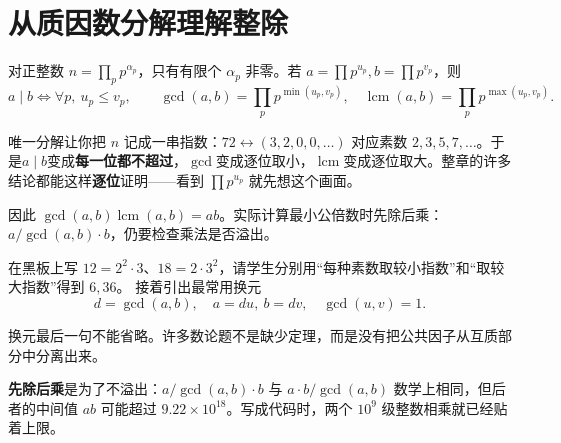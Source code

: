 \documentclass[UTF8,a4paper,11pt,twoside,openright,fontset=fandol]{ctexbook}
\theoremstyle{definition}
\newcommand{\lcm}{\operatorname{lcm}}
\begin{document}
\section{从质因数分解理解整除}
对正整数 $n=\prod_p p^{\alpha_p}$，只有有限个 $\alpha_p$ 非零。若 $a=\prod p^{u_p},b=\prod p^{v_p}$，则
\[
 a\mid b\iff\forall p,\ u_p\le v_p,\qquad
 \gcd(a,b)=\prod_p p^{\min(u_p,v_p)},\quad
 \lcm(a,b)=\prod_p p^{\max(u_p,v_p)}.
\]

\begin{tip}
唯一分解让你把 $n$ 记成一串指数：$72\leftrightarrow(3,2,0,0,\ldots)$ 对应素数 $2,3,5,7,\ldots$。于是\textbf{$a\mid b$}变成\textbf{每一位都不超过}，\textbf{$\gcd$}变成逐位取小，\textbf{$\lcm$}变成逐位取大。整章的许多结论都能这样\textbf{逐位}证明——看到 $\prod p^{u_p}$ 就先想这个画面。
\end{tip}

因此 $\gcd(a,b)\lcm(a,b)=ab$。实际计算最小公倍数时先除后乘：$a/\gcd(a,b)\cdot b$，仍要检查乘法是否溢出。


\begin{teach}
在黑板上写 $12=2^2\cdot3$、$18=2\cdot3^2$，请学生分别用“每种素数取较小指数”和“取较大指数”得到 $6,36$。
接着引出最常用换元
\[
 d=\gcd(a,b),\quad a=du,\ b=dv,\quad\gcd(u,v)=1.
\]


换元最后一句不能省略。许多数论题不是缺少定理，而是没有把公共因子从互质部分中分离出来。
\end{teach}

\begin{tip}
\textbf{先除后乘}是为了不溢出：$a/\gcd(a,b)\cdot b$ 与 $a\cdot b/\gcd(a,b)$ 数学上相同，但后者的中间值 $ab$ 可能超过 $9.22\times10^{18}$。写成代码时，两个 $10^9$ 级整数相乘就已经贴着上限。
\end{tip}
\end{document}
